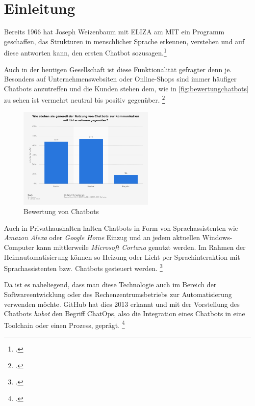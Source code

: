 \chapter{Einleitung}

Bereits 1966 hat Joseph Weizenbaum mit ELIZA am \acf{MIT} ein Programm geschaffen, das Strukturen in menschlicher Sprache erkennen, verstehen und auf diese antworten kann, den ersten Chatbot sozusagen.\footcite[Vgl.][o. \pno]{Weizenbaum_1966}

Auch in der heutigen Gesellschaft ist diese Funktionalität gefragter denn je. Besonders auf Unternehmenswebsiten oder Online-Shops sind immer häufiger Chatbots anzutreffen und die Kunden stehen dem, wie in \autoref{fig:bewertungchatbots} zu sehen ist vermehrt neutral bis positiv gegenüber.
\footcite[Vgl.][50]{Groetz_2018_Sprich_mit_mir}


\begin{figure}[H]
  \centering
  \includegraphics[width=0.6\textwidth]{Anhang/2018_stat_bewertung_chatbots}
  \caption{Bewertung von Chatbots}
\label{fig:bewertungchatbots}
\end{figure}

Auch in Privathaushalten halten Chatbots in Form von Sprachassistenten wie \textit{Amazon Alexa} oder \textit{Google Home} Einzug und an jedem aktuellen Windows-Computer kann mittlerweile \textit{Microsoft Cortana} genutzt werden. Im Rahmen der Heimautomatisierung können so Heizung oder Licht per Sprachinteraktion mit Sprachassistenten bzw. Chatbots gesteuert werden. \footcite[Vgl.][o. \pno]{Kuhn_2015_Sprachassistenten}

Da ist es naheliegend, dass man diese Technologie auch im Bereich der Softwareentwicklung oder des Rechenzentrumsbetriebs zur Automatisierung verwenden möchte. GitHub hat dies 2013 erkannt und mit der Vorstellung des Chatbots \textit{hubot} den Begriff ChatOps, also die Integration eines Chatbots in eine Toolchain oder einen Prozess, geprägt. \footcite[Vgl.][o. \pno]{Github_2013_Chatops}

